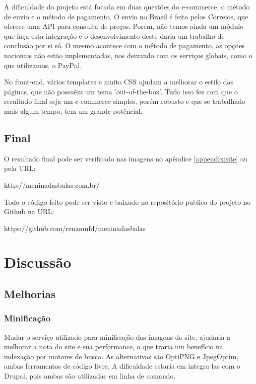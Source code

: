 \documentclass[
	12pt,				%
    oneside,			%
	a4paper,			%
	english,			%
	french,				%
	spanish,			%
	brazil				%
	]{abntex2}
\begin{document}
A dificuldade do projeto está focada em duas questões do e-commerce, o método de envio e o método de pagamento. O envio no Brasil é feito pelos Correios, que oferece uma API para consulta de preços. Porem, não temos ainda um módulo que faça esta integração e o desenvolvimento deste daria um trabalho de conclusão por si só. O mesmo acontece com o método de pagamento, as opções nacionais não estão implementadas, nos deixando com os serviços globais, como o que utilizamos, o PayPal.

No front-end, vários templates e muito CSS ajudam a melhorar o estilo das páginas, que não possuêm um tema 'out-of-the-box'. Tudo isso fez com que o resultado final seja um e-commerce simples, porém robusto e que se trabalhado mais algum tempo, tem um grande potêncial.

\section{Final}

O resultado final pode ser verificado nas imagens no apêndice \ref{appendix:site} ou pela URL:

\begin{center}
  http://meninadasbalas.com.br/
\end{center}

Todo o código feito pode ser visto e baixado no repositório publico do projeto no Github na URL:

\begin{center}
  https://github.com/renanmfd/meninadasbalas
\end{center}

\chapter{Discussão}



\section{Melhorias}

\subsection{Minificação}
Mudar o serviço utilizado para minificação das imagens do site, ajudaria a melhorar a nota do site e sua performance, o que traria um benefício na indexação por motores de busca. As alternativas são OptiPNG e JpegOptim, ambas ferramentas de código livre. A dificuldade estaria em integra-las com o Drupal, pois ambas são utilizadas em linha de comando.
\end{document}
